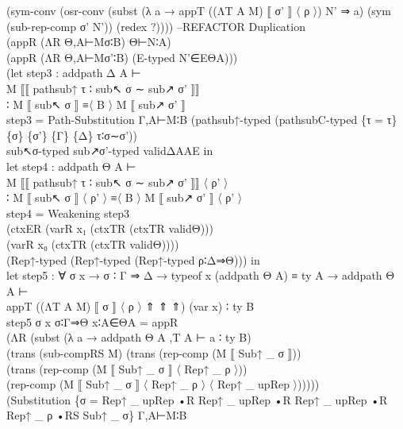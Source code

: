 {\begin{code}
{\>          (sym-conv (osr-conv (subst (λ a → appT ((ΛT A M) ⟦ σ' ⟧ 〈 ρ 〉) N' ⇒ a) (sym (sub-rep-comp σ' N')) (redex ?)))) --REFACTOR Duplication\<\\
\>          (appR (ΛR Θ,A⊢Mσ∶B) Θ⊢N∶A) \<\\
\>          (appR (ΛR Θ,A⊢Mσ'∶B) (E-typed N'∈EΘA)))\<\\
\>        (let step3 : addpath Δ A ⊢\<\\
\>                         M ⟦⟦ pathsub↑ τ ∶ sub↖ σ ∼ sub↗ σ' ⟧⟧\<\\
\>                         ∶ M ⟦ sub↖ σ ⟧ ≡〈 B 〉 M ⟦ sub↗ σ' ⟧\<\\
\>             step3 = Path-Substitution Γ,A⊢M∶B (pathsub↑-typed (pathsubC-typed \{τ = τ\} \{σ\} \{σ'\} \{Γ\} \{Δ\} τ∶σ∼σ')) \<\\
\>                     sub↖σ-typed sub↗σ'-typed validΔAAE in\<\\
\>        let step4 : addpath Θ A ⊢\<\\
\>                    M ⟦⟦ pathsub↑ τ ∶ sub↖ σ ∼ sub↗ σ' ⟧⟧ 〈 ρ' 〉\<\\
\>                  ∶ M ⟦ sub↖ σ ⟧ 〈 ρ' 〉 ≡〈 B 〉 M ⟦ sub↗ σ' ⟧ 〈 ρ' 〉\<\\
\>            step4 = Weakening step3 \<\\
\>                    (ctxER (varR x₁ (ctxTR (ctxTR validΘ)))\<\\
\>                    (varR x₀ (ctxTR (ctxTR validΘ))))\<\\
\>                    (Rep↑-typed (Rep↑-typed (Rep↑-typed ρ∶Δ⇒Θ))) in\<\\
\>        let step5 : ∀ σ x → σ ∶ Γ ⇒ Δ → typeof x (addpath Θ A) ≡ ty A → addpath Θ A ⊢\<\\
\>                    appT ((ΛT A M) ⟦ σ ⟧ 〈 ρ 〉 ⇑ ⇑ ⇑) (var x) ∶ ty B\<\\
\>            step5 σ x σ∶Γ⇒Θ x∶A∈ΘA = appR \<\\
\>                           (ΛR (subst (λ a → addpath Θ A ,T A ⊢ a ∶ ty B) \<\\
\>                           (trans (sub-compRS M) (trans (rep-comp (M ⟦ Sub↑ \_ σ ⟧))\<\\
\>                           (trans (rep-comp (M ⟦ Sub↑ \_ σ ⟧ 〈 Rep↑ \_ ρ 〉)) \<\\
\>                             (rep-comp (M ⟦ Sub↑ \_ σ ⟧ 〈 Rep↑ \_ ρ 〉 〈 Rep↑ \_ upRep 〉)))))\<\\
\>                         (Substitution \{σ = Rep↑ \_ upRep •R Rep↑ \_ upRep •R Rep↑ \_ upRep •R Rep↑ \_ ρ •RS Sub↑ \_ σ\} Γ,A⊢M∶B \<\\
}
\end{code}}
